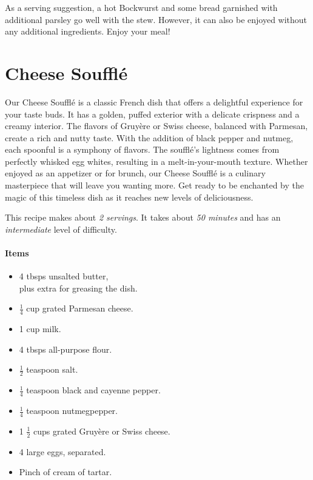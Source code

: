 As a serving suggestion, a hot Bockwurst and some bread garnished with additional parsley go well with the stew. However, it can also be enjoyed without any additional ingredients. Enjoy your meal!
\clearpage

\section{Cheese Soufflé}
\label{cheesesouffle}
Our Cheese Soufflé is a classic French dish that offers a delightful experience for your taste buds. It has a golden, puffed exterior with a delicate crispness and a creamy interior. The flavors of Gruyère or Swiss cheese, balanced with Parmesan, create a rich and nutty taste. With the addition of black pepper and nutmeg, each spoonful is a symphony of flavors. The soufflé's lightness comes from perfectly whisked egg whites, resulting in a melt-in-your-mouth texture. Whether enjoyed as an appetizer or for brunch, our Cheese Soufflé is a culinary masterpiece that will leave you wanting more. Get ready to be enchanted by the magic of this timeless dish as it reaches new levels of deliciousness.

This recipe makes about \emph{2 servings}. It takes about \emph{50 minutes} and has an \emph{intermediate} level of difficulty. 

\paragraph{Items}
\begin{itemize}[noitemsep]
	\item[\ding{182}] 4 tbsps unsalted butter, \\ plus extra for greasing the dish.
	\item[\ding{183}] $\frac{1}{4}$ cup grated Parmesan cheese.
	\item[\ding{184}] 1 cup milk.
	\item[\ding{185}] 4 tbsps all-purpose flour.
	\item[\ding{186}] $\frac{1}{2}$ teaspoon salt.
	\item[\ding{187}] $\frac{1}{4}$ teaspoon black and cayenne pepper.
	\item[\ding{188}] $\frac{1}{4}$ teaspoon nutmegpepper.
	\item[\ding{189}] 1 $\frac{1}{2}$ cups grated Gruyère or Swiss cheese.
	\item[\ding{190}] 4 large eggs, separated.
	\item[\ding{191}] Pinch of cream of tartar.	
\end{itemize}

